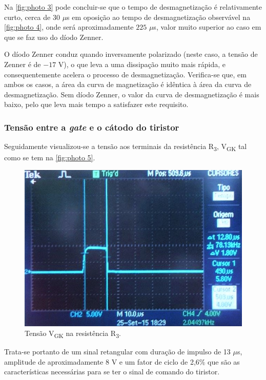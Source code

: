 \documentclass[a4paper,11pt]{article}
\numberwithin{equation}{section}
\begin{document}
Na \autoref{fig:photo 3} pode concluir-se que o tempo de desmagnetização é relativamente curto, cerca de $30$ $\mu$s em oposição ao tempo de desmagnetização observável na \autoref{fig:photo 4}, onde será aproximadamente $225$ $\mu$s, valor muito superior ao caso em que se faz uso do díodo Zenner.

O díodo Zenner conduz quando inversamente polarizado (neste caso, a tensão de Zenner é de $-17$ V), o que leva a uma dissipação muito mais rápida, e consequentemente acelera o processo de desmagnetização. Verifica-se que, em ambos os casos, a área da curva de magnetização é idêntica à área da curva de desmagnetização. Sem díodo Zenner, o valor da curva de desmagnetização é mais baixo, pelo que leva mais tempo a satisfazer este requisito. 

\subsubsection{Tensão entre a \textit{gate} e o cátodo do tiristor}

Seguidamente visualizou-se a tensão aos terminais da resistência R\textsubscript{3},  V\textsubscript{GK} tal como se tem na \autoref{fig:photo 5}.

\begin{figure}[h]
	\centering
	\includegraphics[keepaspectratio=true, scale=0.63]{img/fig8}
	\caption{Tensão V\textsubscript{GK} na resistência R\textsubscript{3}.}
	\label{fig:photo 5}
	\vspace{-0.8em}
\end{figure}

Trata-se portanto de um sinal retangular com duração de impulso de 13 $\mu$s, amplitude de aproximadamente 8 V e um fator de ciclo de 2,6\% que são as características necessárias para se ter o sinal de comando do tiristor.
\end{document}
